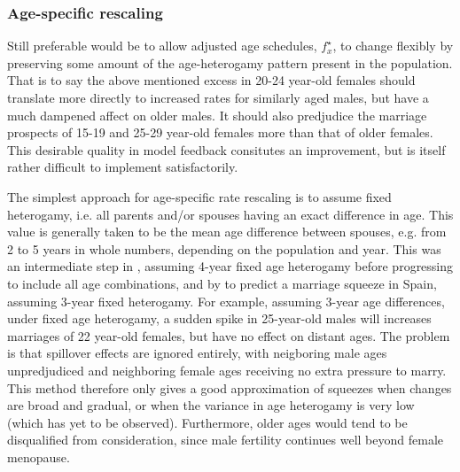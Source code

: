 \subsubsection{Age-specific rescaling}
Still preferable would be to allow adjusted age schedules, $f_x^{\star}$, to change flexibly by preserving some amount of the age-heterogamy pattern present in the population. That is to say the above mentioned excess in 20-24 year-old females should translate more directly to increased rates for similarly aged males, but have a much dampened affect on older males. It should also predjudice the marriage prospects of 15-19 and 25-29 year-old females more than that of older females. This desirable quality in model feedback consitutes an improvement, but is itself rather difficult to implement satisfactorily. 

The simplest approach for age-specific rate rescaling is to assume fixed heterogamy, i.e. all parents and/or spouses having an exact difference in age. This value is generally taken to be the mean age difference between spouses, e.g. from 2 to 5 years in whole numbers, depending on the population and year. This was an intermediate step in \citet{karmel1947relations}, assuming 4-year fixed age heterogamy before progressing to include all age combinations, and by \citet{cabre1997tortulos} to predict a marriage squeeze in Spain, assuming 3-year fixed heterogamy. For example, assuming 3-year age differences, under fixed age heterogamy, a sudden spike in 25-year-old males will increases marriages of 22 year-old females, but have no effect on distant ages. The problem is that spillover effects are ignored entirely, with neigboring male ages unpredjudiced and neighboring female ages receiving no extra pressure to marry. This method therefore only gives a good approximation of squeezes when changes are broad and gradual, or when the variance in age heterogamy is very low (which has yet to be observed). Furthermore, older ages would tend to be disqualified from consideration, since male fertility continues well beyond female menopause.

